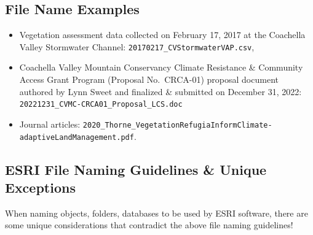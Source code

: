 \documentclass[
]{book}
\providecommand{\tightlist}{%
  \setlength{\itemsep}{0pt}\setlength{\parskip}{0pt}}
\begin{document}
\hypertarget{file-name-examples}{%
\subsection{File Name Examples}\label{file-name-examples}}

\begin{itemize}
\tightlist
\item
  Vegetation assessment data collected on February 17, 2017 at the Coachella Valley Stormwater Channel: \texttt{20170217\_CVStormwaterVAP.csv},
\item
  Coachella Valley Mountain Conservancy Climate Resistance \& Community Access Grant Program (Proposal No.~CRCA-01) proposal document authored by Lynn Sweet and finalized \& submitted on December 31, 2022: \texttt{20221231\_CVMC-CRCA01\_Proposal\_LCS.doc}
\item
  Journal articles: \texttt{2020\_Thorne\_VegetationRefugiaInformClimate-adaptiveLandManagement.pdf}.
\end{itemize}

\hypertarget{esri-file-naming-guidelines-unique-exceptions}{%
\subsection{ESRI File Naming Guidelines \& Unique Exceptions}\label{esri-file-naming-guidelines-unique-exceptions}}

When naming objects, folders, databases to be used by ESRI software, there are some unique considerations that contradict the above file naming guidelines!
\end{document}
